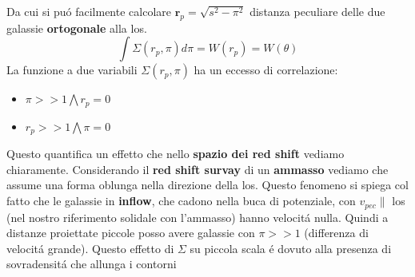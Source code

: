 \documentclass[12pt, a4paper]{article}
\begin{document}
Da cui si pu\'{o} facilmente calcolare $\mathbf{r}_p=\sqrt{s^2-\pi^2}$ distanza peculiare delle due galassie \textbf{ortogonale} alla los.
\begin{equation}
\int \Sigma(r_p, \pi) d\pi= W(r_p)=W(\theta)
\end{equation}
La funzione a due variabili $\Sigma(r_p, \pi)$ ha un eccesso di correlazione:
\begin{itemize}
\item $\pi>>1 \bigwedge r_p=0$
\item $r_p>>1 \bigwedge \pi=0$
\end{itemize}
Questo quantifica un effetto che nello \textbf{spazio dei red shift} vediamo chiaramente. Considerando il \textbf{red shift survay} di un \textbf{ammasso} vediamo che assume una forma oblunga nella direzione della los. Questo fenomeno si spiega col fatto che le galassie in \textbf{inflow}, che cadono nella buca di potenziale, con $v_{pec} \parallel$ los (nel nostro riferimento solidale con l'ammasso) hanno velocit\'{a} nulla. Quindi a distanze proiettate piccole posso avere galassie con $\pi>>1$ (differenza di velocit\'{a} grande). Questo effetto di $\Sigma$ su piccola scala \'{e} dovuto alla presenza di sovradensit\'{a} che allunga i contorni 
\end{document}
